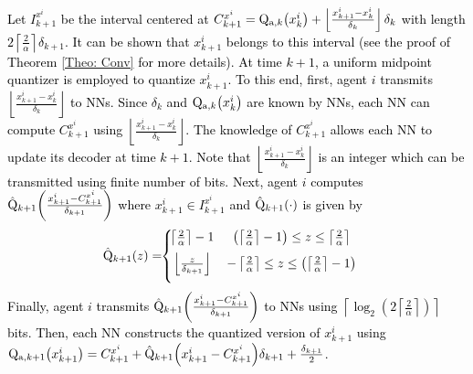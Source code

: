 \documentclass[10pt,twocolumn,twoside]{IEEEtran}
\begin{document}
\textcolor{black}{Let $I^{x^i}_{k+1}$ be the interval centered at $C^{x^i}_{k+1}={\rm Q}_{{\rm a},k}{\left({x^i_{k}}\right)}+\left\lfloor \frac{x^i_{k+1}-x^i_{k}}{\delta_k}\right\rfloor\delta_k$ with length $2\left\lceil \frac{2}{\alpha}\right\rceil\delta_{k+1}$. It can be shown that $x^i_{k+1}$ belongs to this interval (see the proof of Theorem \ref{Theo: Conv} for more details).  At time $k+1$, a uniform midpoint quantizer is employed to quantize $x^{i}_{k+1}$. To this end, first, agent $i$ transmits $\left\lfloor \frac{x^i_{k+1}-x^i_{k}}{\delta_k}\right\rfloor$ to NNs. Since $\delta_k$ and ${\rm Q}_{{\rm a},k}{\left({x^i_{k}}\right)}$ are known by NNs, each NN can compute $C^{x^i}_{k+1}$ using $\left\lfloor \frac{x^i_{k+1}-x^i_{k}}{\delta_k}\right\rfloor$. The knowledge of $C^{x^i}_{k+1}$ allows each NN to update its decoder at time $k+1$. Note that $\left\lfloor \frac{x^i_{k+1}-x^i_{k}}{\delta_k}\right\rfloor$ is an integer which can be transmitted using finite number of bits. Next, agent $i$ computes ${\rm \hat{Q}}_{k+1}{\left({\frac{x^i_{k+1}-C^{x^i}_{k+1}}{\delta_{k+1}}}\right)}$ where $x^i_{k+1}\in I^{x^i}_{k+1}$ and ${\rm \hat{Q}}_{k+1}{\left({\cdot}\right)}$ is given by 
\begin{eqnarray}\label{Eq: UQant}
\hspace{-2mm}{\rm \hat{Q}}_{k+1}{\left({z}\right)}=\!\!\left\{\!\!\!\!
\begin{array}{cc}
\vspace{2mm}\left\lceil \frac{2}{\alpha}\right\rceil-1 &{\left({\left\lceil \frac{2}{\alpha}\right\rceil-1}\right)}\leq z\leq \left\lceil \frac{2}{\alpha}\right\rceil\\
\vspace{2mm}\left\lfloor \frac{z}{\delta_{k+1}}\right\rfloor& -\left\lceil \frac{2}{\alpha}\right\rceil\leq z\leq {\left({\left\lceil \frac{2}{\alpha}\right\rceil-1}\right)}\\
\end{array}
\right.
\end{eqnarray}
Finally, agent $i$ transmits ${\rm \hat{Q}}_{k+1}{\left({\frac{x^i_{k+1}-C^{x^i}_{k+1}}{\delta_{k+1}}}\right)}$ to NNs using $\left\lceil \log_2{\left({2\left\lceil \frac{2}{\alpha}\right\rceil}\right)}\right\rceil$ bits. Then, each NN constructs the quantized version of $x^i_{k+1}$ using ${\rm Q}_{{\rm a},k+1}{\left({x^i_{k+1}}\right)}=C^{x^i}_{k+1}+{\rm \hat{Q}}_{k+1}{\left({x^i_{k+1}-C^{x^i}_{k+1}}\right)}\delta_{k+1}+\frac{\delta_{k+1}}{2}$.}
\end{document}
